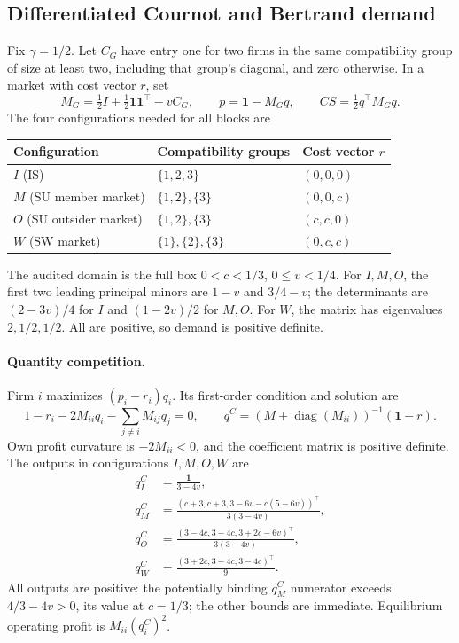 \subsection{Differentiated Cournot and Bertrand demand}
Fix $\gamma=1/2$. Let $C_G$ have entry one for two firms in the same
compatibility group of size at least two, including that group's diagonal,
and zero otherwise. In a market with cost vector $r$, set
\[
M_G=\tfrac12 I+\tfrac12\mathbf1\mathbf1^\top-vC_G,
\qquad p=\mathbf1-M_Gq,
\qquad CS=\tfrac12q^\top M_Gq.
\]
The four configurations needed for all blocks are
\begin{center}\small
\begin{tabular}{@{}lll@{}}\toprule
Configuration & Compatibility groups & Cost vector $r$\\\midrule
$I$ (IS) & $\{1,2,3\}$ & $(0,0,0)$\\
$M$ (SU member market) & $\{1,2\},\{3\}$ & $(0,0,c)$\\
$O$ (SU outsider market) & $\{1,2\},\{3\}$ & $(c,c,0)$\\
$W$ (SW market) & $\{1\},\{2\},\{3\}$ & $(0,c,c)$\\\bottomrule
\end{tabular}\end{center}
The audited domain is the full box $0<c<1/3$, $0\le v<1/4$.
For $I,M,O$, the first two leading principal minors are $1-v$ and
$3/4-v$; the determinants are $(2-3v)/4$ for $I$ and
$(1-2v)/2$ for $M,O$. For $W$, the matrix has eigenvalues
$2,1/2,1/2$. All are positive, so demand is positive definite.

\paragraph{Quantity competition.}
Firm $i$ maximizes $(p_i-r_i)q_i$. Its first-order condition and solution are
\[
1-r_i-2M_{ii}q_i-\sum_{j\ne i}M_{ij}q_j=0,
\qquad q^{C}=(M+\operatorname{diag}(M_{ii}))^{-1}(\mathbf1-r).
\]
Own profit curvature is $-2M_{ii}<0$, and the coefficient matrix is positive
definite. The outputs in configurations $I,M,O,W$ are
\begin{align*}
q^C_I&=\frac{\mathbf1}{3-4v},\\
q^C_M&=\frac{(c+3,c+3,3-6v-c(5-6v))^\top}{3(3-4v)},\\
q^C_O&=\frac{(3-4c,3-4c,3+2c-6v)^\top}{3(3-4v)},\\
q^C_W&=\frac{(3+2c,3-4c,3-4c)^\top}{9}.
\end{align*}
All outputs are positive: the potentially binding $q^C_M$ numerator exceeds
$4/3-4v>0$, its value at $c=1/3$; the other bounds are immediate.
Equilibrium operating profit is $M_{ii}(q_i^C)^2$.

